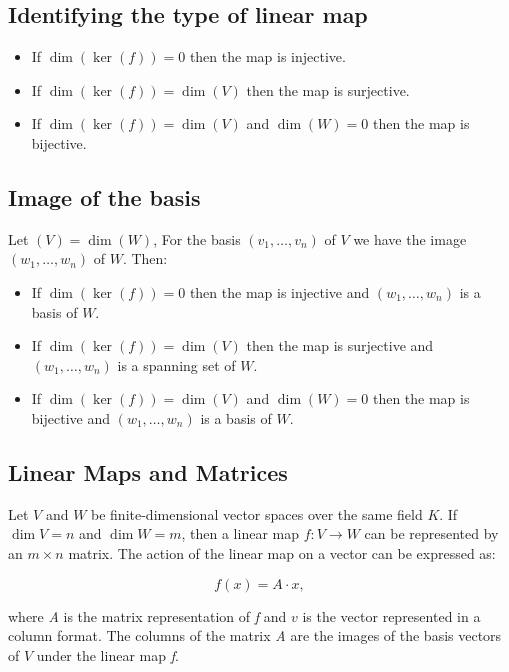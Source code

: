 \QED
  
\subsection{Identifying the type of linear map}

\begin{itemize} 
    \item If \(\dim(\ker(f)) = 0\) then the map is injective.
    \item If \(\dim(\ker(f)) = \dim(V)\) then the map is surjective.
    \item If \(\dim(\ker(f)) = \dim(V)\) and \(\dim(W) = 0\) then the map is bijective.
\end{itemize}

\subsection{Image of the basis}

Let \((V) = \dim(W)\), For the basis \((v_1, \dots, v_n)\) of \(V\) we have the image \((w_1, \dots, w_n)\) of \(W\). Then:

\begin{itemize}
    \item If \(\dim(\ker(f)) = 0\) then the map is injective and \((w_1, \dots, w_n)\) is a basis of \(W\).    
    \item If \(\dim(\ker(f)) = \dim(V)\) then the map is surjective and \((w_1, \dots, w_n)\) is a spanning set of \(W\).
    \item If \(\dim(\ker(f)) = \dim(V)\) and \(\dim(W) = 0\) then the map is bijective and \((w_1, \dots, w_n)\) is a 
    basis of \(W\).
\end{itemize}

\subsection{Linear Maps and Matrices}

Let \( V \) and \( W \) be finite-dimensional vector spaces over the same field \( K \). 
If \( \dim V = n \) and \( \dim W = m \), then a linear map \( f: V \to W \) can be represented by 
an \( m \times n \) matrix. The action of the linear map on a vector can be expressed as:

\[
    f(x) = A \cdot x,
\]

where \emph{A} is the matrix representation of \emph{f} and \( v \) is the vector represented in a column 
format. The columns of the matrix \emph{A} are the images of the basis vectors of \( V \) under the linear 
map \emph{f}.

